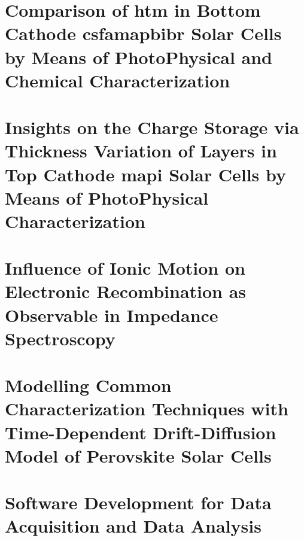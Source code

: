 \documentclass[b5paper, 12pt, openright]{book} %
\begin{document}
\chapter{Comparison of \gls{htm} in Bottom Cathode \gls{csfamapbibr} Solar Cells by Means of PhotoPhysical and Chemical Characterization}\label{ch:tae}
	\graphicspath{ {./contents_img/tae/} }
	

\chapter{Insights on the Charge Storage via Thickness Variation of Layers in Top Cathode \gls{mapi} Solar Cells by Means of PhotoPhysical Characterization}\label{ch:thicknesses}
	\graphicspath{ {./contents_img/thicknesses/} }
	


\chapter{Influence of Ionic Motion on Electronic Recombination as Observable in Impedance Spectroscopy}\label{ch:impedance}
	\graphicspath{ {./contents_img/impedance/} }
	

\chapter{Modelling Common Characterization Techniques with Time-Dependent Drift-Diffusion Model of Perovskite Solar Cells}\label{ch:modelling}
	\graphicspath{ {./contents_img/modelling/} }
	

\chapter{Software Development for Data Acquisition and Data Analysis}\label{ch:software}
	\graphicspath{ {./contents_img/software/} }
	
\end{document}
